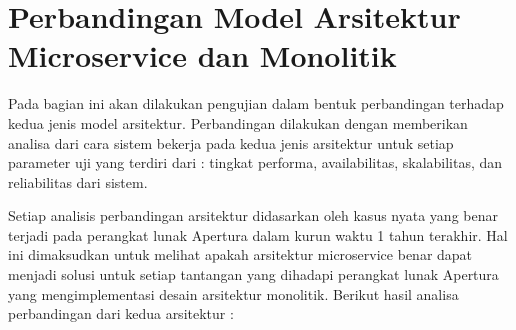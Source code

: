 \section{Perbandingan Model Arsitektur Microservice dan Monolitik}
Pada bagian ini akan dilakukan pengujian dalam bentuk perbandingan terhadap kedua jenis model arsitektur. Perbandingan dilakukan dengan memberikan analisa dari cara sistem bekerja pada kedua jenis arsitektur untuk setiap parameter uji yang terdiri dari : tingkat performa, availabilitas, skalabilitas, dan reliabilitas dari sistem.

Setiap analisis perbandingan arsitektur didasarkan oleh kasus nyata yang benar terjadi pada perangkat lunak Apertura dalam kurun waktu 1 tahun terakhir. Hal ini dimaksudkan untuk melihat apakah arsitektur microservice benar dapat menjadi solusi untuk setiap tantangan yang dihadapi perangkat lunak Apertura yang mengimplementasi desain arsitektur monolitik.
Berikut hasil analisa perbandingan dari kedua arsitektur :
